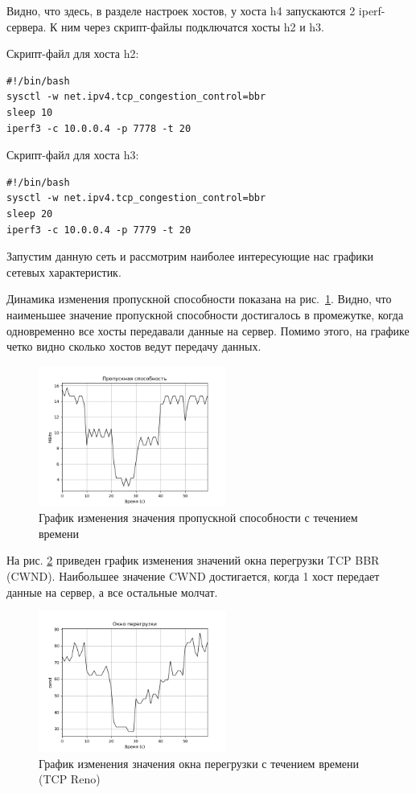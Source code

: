Видно, что здесь, в разделе настроек хостов, у хоста h4 запускаются 2
iperf-сервера. К ним через скрипт-файлы подключатся хосты h2 и h3.

Скрипт-файл для хоста h2:
\begin{verbatim}
#!/bin/bash
sysctl -w net.ipv4.tcp_congestion_control=bbr
sleep 10
iperf3 -c 10.0.0.4 -p 7778 -t 20
\end{verbatim}

Скрипт-файл для хоста h3:
\begin{verbatim}
#!/bin/bash
sysctl -w net.ipv4.tcp_congestion_control=bbr
sleep 20
iperf3 -c 10.0.0.4 -p 7779 -t 20
\end{verbatim}

Запустим данную сеть и рассмотрим наиболее интересующие нас графики
сетевых характеристик.

Динамика изменения пропускной способности показана на
рис.~\ref{fig:30015}. Видно, что наименьшее значение пропускной
способности достигалось в промежутке, когда одновременно все хосты
передавали данные на сервер. Помимо этого, на графике четко видно
сколько хостов ведут передачу данных.

\begin{figure}[!h]
\centering
\includegraphics[width=0.55\textwidth]{image/ch03_02/throughput.png}
\caption{График изменения значения пропускной способности с течением
времени}\label{fig:30015}
\end{figure}

На рис. \ref{fig:30013} приведен график изменения значений окна
перегрузки TCP BBR (CWND). %
Наибольшее значение CWND достигается, %
когда 1 хост передает данные на сервер, а все остальные молчат.

\begin{figure}[!h]
\centering
\includegraphics[width=0.55\textwidth]{image/ch03_02/cwnd.png}
\caption{График изменения значения окна перегрузки с течением времени
(TCP Reno)}\label{fig:30013}
\end{figure}

